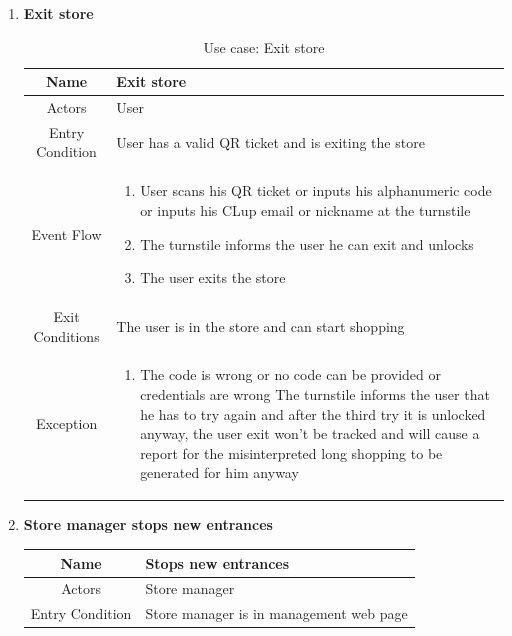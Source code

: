 \begin{enumerate}
\item \textbf{Exit store}

\begin{table}[H]
	{
		\begin{tabular}{|c|p{14cm}|}
			\hline
			Name & Exit store\\
			\hline
			Actors & User\\
			\hline
			Entry Condition & User has a valid QR ticket and is exiting the store\\
			\hline
			
			Event Flow & \begin{enumerate}
				\item User scans his QR ticket or inputs his alphanumeric code or inputs his CLup email or nickname at the turnstile
				\item The turnstile informs the user he can exit and unlocks
				\item The user exits the store
				
			\end{enumerate}\\
			
			\hline
			Exit Conditions & The user is in the store and can start shopping\\
			\hline
			
			Exception & \begin{enumerate}
				\item The code is wrong or no code can be provided or credentials are wrong\newline
				The turnstile informs the user that he has to try again and after the third try it is unlocked anyway, the user exit won’t be tracked and will cause a report for the misinterpreted long shopping to be generated for him anyway
				
				
			\end{enumerate}\\
			
			\hline
		\end{tabular}
	}
	\label{tab:UCExit}
	\caption{Use case: Exit store}
\end{table}

\item \textbf{Store manager stops new entrances}

\begin{table}[H]
	{
		\begin{tabular}{|c|p{14cm}|}
			\hline
			Name & Stops new entrances\\
			\hline
			Actors & Store manager\\
			\hline
			Entry Condition & Store manager is in management web page\\
			\hline
			

\end{tabular}}
\end{table}
\end{enumerate}
